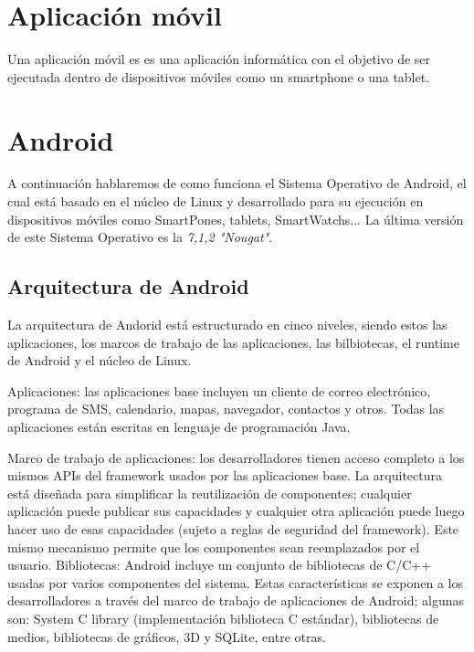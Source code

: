 
\section{Aplicación móvil}

Una aplicación móvil es es una aplicación informática con el objetivo de ser ejecutada dentro de dispositivos móviles como un smartphone o una tablet.

\section{Android}

A continuación hablaremos de como funciona el Sistema Operativo de Android, el cual está basado en el núcleo de Linux y desarrollado para su ejecución en dispositivos móviles como SmartPones, tablets, SmartWatchs...
La última versión de este Sistema Operativo es la \textit{7,1,2 "Nougat"}.

\subsection{Arquitectura de Android}
La arquitectura de Andorid está estructurado en cinco niveles, siendo estos las aplicaciones, los marcos de trabajo de las aplicaciones, las bilbiotecas, el runtime de Android y el núcleo de Linux.

Aplicaciones: las aplicaciones base incluyen un cliente de correo electrónico, programa de SMS, calendario, mapas, navegador, contactos y otros. Todas las aplicaciones están escritas en lenguaje de programación Java.

Marco de trabajo de aplicaciones: los desarrolladores tienen acceso completo a los mismos APIs del framework usados por las aplicaciones base. La arquitectura está diseñada para simplificar la reutilización de componentes; cualquier aplicación puede publicar sus capacidades y cualquier otra aplicación puede luego hacer uso de esas capacidades (sujeto a reglas de seguridad del framework). Este mismo mecanismo permite que los componentes sean reemplazados por el usuario.
Bibliotecas: Android incluye un conjunto de bibliotecas de C/C++ usadas por varios componentes del sistema. Estas características se exponen a los desarrolladores a través del marco de trabajo de aplicaciones de Android; algunas son: System C library (implementación biblioteca C estándar), bibliotecas de medios, bibliotecas de gráficos, 3D y SQLite, entre otras.

